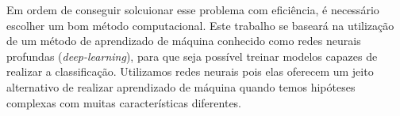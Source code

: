 Em ordem de conseguir solcuionar esse problema com eficiência, é necessário escolher um bom método computacional. Este trabalho se baseará na utilização de um método de aprendizado de máquina conhecido como redes neurais profundas (\textit{deep-learning}), para que seja possível treinar modelos capazes de realizar a classificação. Utilizamos redes neurais pois elas oferecem um jeito alternativo de realizar aprendizado de máquina quando temos hipóteses complexas com muitas características diferentes. 

